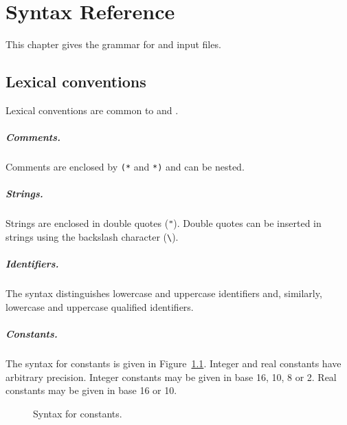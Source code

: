 \chapter{Syntax Reference}
\label{chap:syntaxref}

This chapter gives the grammar for \why and \whyml input files.

\section{Lexical conventions}

Lexical conventions are common to \why and \whyml.


\paragraph{Comments.}
Comments are enclosed by \texttt{(*} and \texttt{*)} and can be nested.

\paragraph{Strings.}
Strings are enclosed in double quotes (\verb!"!). Double quotes can be
inserted in strings using the backslash character (\verb!\!).


\paragraph{Identifiers.} The syntax distinguishes lowercase and
uppercase identifiers and, similarly, lowercase and uppercase
qualified identifiers.

\begin{center}\framebox{}\end{center}

\paragraph{Constants.}
The syntax for constants is given in Figure~\ref{fig:bnf:constant}.
Integer and real constants have arbitrary precision.
Integer constants may be given in base 16, 10, 8 or 2.
Real constants may be given in base 16 or 10.

\begin{figure}
\begin{center}\framebox{}\end{center}
  \caption{Syntax for constants.}
\label{fig:bnf:constant}
\end{figure}

